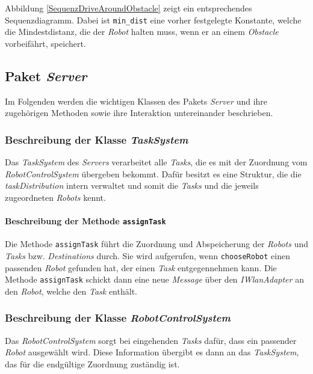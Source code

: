 			Abbildung \ref{SequenzDriveAroundObstacle} zeigt ein entsprechendes Sequenzdiagramm. 
			Dabei ist \texttt{min\_dist} eine vorher festgelegte Konstante, welche die Mindestdistanz, die der \textit{Robot} halten muss, wenn er an einem \textit{Obstacle} vorbeifährt, speichert.
	
\pagebreak
	
\subsection{Paket \textit{Server}}
	Im Folgenden werden die wichtigen Klassen des Pakets \textit{Server} 
	und ihre zugehörigen Methoden sowie ihre Interaktion untereinander beschrieben. 


	\subsubsection{Beschreibung der Klasse \textit{TaskSystem}}
		Das \emph{TaskSystem} des \emph{Servers} verarbeitet alle \emph{Tasks}, die es mit der Zuordnung vom \emph{RobotControlSystem} übergeben bekommt. 
		Dafür besitzt es eine Struktur, die die \emph{taskDistribution} intern verwaltet und somit die \emph{Tasks} und die jeweils zugeordneten \emph{Robots} kennt.
		
			\paragraph{Beschreibung der Methode \texttt{assignTask}}
			Die Methode \texttt{assignTask} führt die Zuordnung und Abspeicherung der \emph{Robots} und \emph{Tasks} bzw. \emph{Destinations} durch. 
			Sie wird aufgerufen, wenn \texttt{chooseRobot} einen passenden \textit{Robot} gefunden hat, der einen \textit{Task} entgegennehmen kann. 
			Die Methode \texttt{assignTask} schickt dann eine neue \textit{Message} über den \textit{IWlanAdapter} an den \textit{Robot}, welche den \textit{Task} enthält.
			
	\subsubsection{Beschreibung der Klasse \textit{RobotControlSystem}}
		Das \emph{RobotControlSystem} sorgt bei eingehenden \emph{Tasks} dafür, dass ein passender \emph{Robot} ausgewählt wird. 
		Diese Information übergibt es dann an das \emph{TaskSystem}, das für die endgültige Zuordnung zuständig ist.
	
